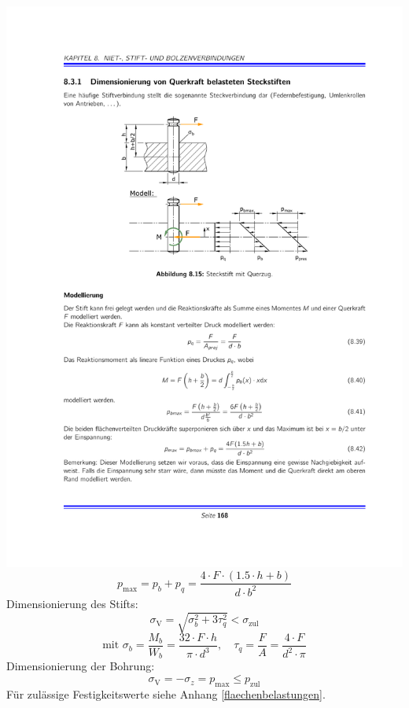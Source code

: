 		\includegraphics[width=\columnwidth]{graphics/steckstift_quer_2}
		\begin{equation*}
			p_{\text{max}} = p_b + p_q = \frac{4 \cdot F \cdot (1.5 \cdot h + b)}{d \cdot b^2}
		\end{equation*}
		Dimensionierung des Stifts:
		\begin{equation*}
			\sigma_{\text{V}} = \sqrt{\sigma_b^2 + 3 \tau_q^2} < \sigma_{\text{zul}}
		\end{equation*}
		\begin{equation*}
			\text{mit } \sigma_b = \frac{M_b}{W_b}=\frac{32 \cdot F \cdot h}{\pi \cdot d^3}, \quad \tau_q = \frac{F}{A}= \frac{4 \cdot F}{d^2 \cdot \pi}
		\end{equation*}
		Dimensionierung der Bohrung:
		\begin{equation*}
			\sigma_{\text{V}} = - \sigma_z = p_{\text{max}} \leq p_{\text{zul}}
		\end{equation*}
		Für zulässige Festigkeitswerte siehe Anhang \ref{flaechenbelastungen}.
